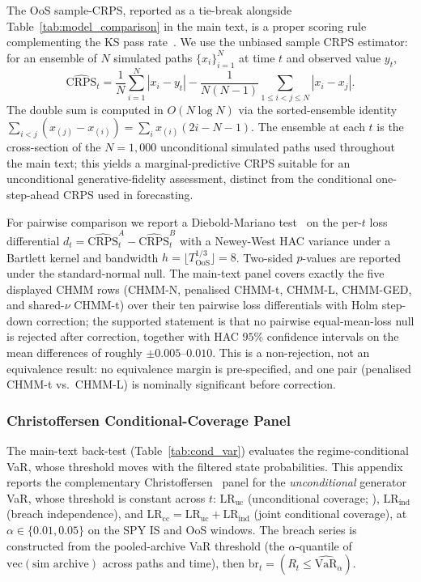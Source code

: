 The OoS sample-CRPS, reported as a tie-break alongside Table~\ref{tab:model_comparison} in the main text, is a proper scoring rule complementing the KS pass rate~\citep{gneiting2007strictly}. We use the unbiased sample CRPS estimator: for an ensemble of $N$ simulated paths $\{x_i\}_{i=1}^N$ at time $t$ and observed value $y_t$,
\begin{equation}
    \widehat{\text{CRPS}}_t = \frac{1}{N} \sum_{i=1}^N |x_i - y_t| - \frac{1}{N(N-1)} \sum_{1 \le i < j \le N} |x_i - x_j|.
\end{equation}
The double sum is computed in $O(N \log N)$ via the sorted-ensemble identity $\sum_{i<j} (x_{(j)} - x_{(i)}) = \sum_i x_{(i)} (2i - N - 1)$. The ensemble at each $t$ is the cross-section of the $N = 1{,}000$ unconditional simulated paths used throughout the main text; this yields a marginal-predictive CRPS suitable for an unconditional generative-fidelity assessment, distinct from the conditional one-step-ahead CRPS used in forecasting.

For pairwise comparison we report a Diebold-Mariano test~\citep{diebold1995comparing} on the per-$t$ loss differential $d_t = \widehat{\text{CRPS}}_t^A - \widehat{\text{CRPS}}_t^B$ with a Newey-West HAC variance under a Bartlett kernel and bandwidth $h = \lfloor T_{\text{OoS}}^{1/3} \rfloor = 8$. Two-sided $p$-values are reported under the standard-normal null. The main-text panel covers exactly the five displayed CHMM rows (CHMM-N, penalised CHMM-t, CHMM-L, CHMM-GED, and shared-$\nu$ CHMM-t) over their ten pairwise loss differentials with Holm step-down correction; the supported statement is that no pairwise equal-mean-loss null is rejected after correction, together with HAC $95\%$ confidence intervals on the mean differences of roughly $\pm 0.005$--$0.010$. This is a non-rejection, not an equivalence result: no equivalence margin is pre-specified, and one pair (penalised CHMM-t vs.\ CHMM-L) is nominally significant before correction.

\subsubsection{Christoffersen Conditional-Coverage Panel}
\label{sec:christoffersen_supp}

The main-text back-test (Table~\ref{tab:cond_var}) evaluates the regime-conditional VaR, whose threshold moves with the filtered state probabilities. This appendix reports the complementary Christoffersen~\cite{christoffersen1998evaluating} panel for the \emph{unconditional} generator VaR, whose threshold is constant across $t$: $\text{LR}_{\text{uc}}$ (unconditional coverage; \citealp{kupiec1995techniques}), $\text{LR}_{\text{ind}}$ (breach independence), and $\text{LR}_{\text{cc}} = \text{LR}_{\text{uc}} + \text{LR}_{\text{ind}}$ (joint conditional coverage), at $\alpha \in \{0.01, 0.05\}$ on the SPY IS and OoS windows. The breach series is constructed from the pooled-archive VaR threshold (the $\alpha$-quantile of $\mathrm{vec}(\text{sim archive})$ across paths and time), then $\text{br}_t = (R_t \le \widehat{\text{VaR}}_\alpha)$.

